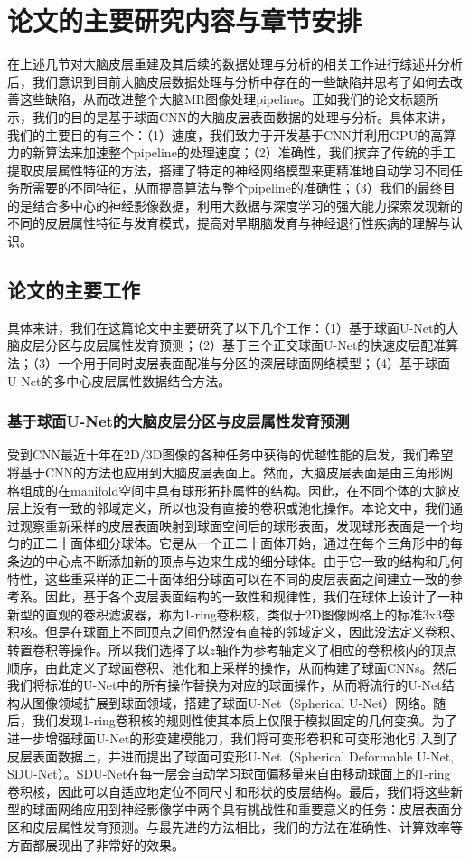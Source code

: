 \section{论文的主要研究内容与章节安排}
在上述几节对大脑皮层重建及其后续的数据处理与分析的相关工作进行综述并分析后，我们意识到目前大脑皮层数据处理与分析中存在的一些缺陷并思考了如何去改善这些缺陷，从而改进整个大脑MR图像处理pipeline。正如我们的论文标题所示，我们的目的是基于球面CNN的大脑皮层表面数据的处理与分析。具体来讲，我们的主要目的有三个：（1）速度，我们致力于开发基于CNN并利用GPU的高算力的新算法来加速整个pipeline的处理速度；（2）准确性，我们摈弃了传统的手工提取皮层属性特征的方法，搭建了特定的神经网络模型来更精准地自动学习不同任务所需要的不同特征，从而提高算法与整个pipeline的准确性；（3）我们的最终目的是结合多中心的神经影像数据，利用大数据与深度学习的强大能力探索发现新的不同的皮层属性特征与发育模式，提高对早期脑发育与神经退行性疾病的理解与认识。

\subsection{论文的主要工作}
具体来讲，我们在这篇论文中主要研究了以下几个工作：（1）基于球面U-Net的大脑皮层分区与皮层属性发育预测；（2）基于三个正交球面U-Net的快速皮层配准算法；（3）一个用于同时皮层表面配准与分区的深层球面网络模型；（4）基于球面U-Net的多中心皮层属性数据结合方法。

\subsubsection{基于球面U-Net的大脑皮层分区与皮层属性发育预测}
受到CNN最近十年在2D/3D图像的各种任务中获得的优越性能的启发，我们希望将基于CNN的方法也应用到大脑皮层表面上。然而，大脑皮层表面是由三角形网格组成的在manifold空间中具有球形拓扑属性的结构。因此，在不同个体的大脑皮层上没有一致的邻域定义，所以也没有直接的卷积或池化操作。本论文中，我们通过观察重新采样的皮层表面映射到球面空间后的球形表面，发现球形表面是一个均匀的正二十面体细分球体。它是从一个正二十面体开始，通过在每个三角形中的每条边的中心点不断添加新的顶点与边来生成的细分球体。由于它一致的结构和几何特性，这些重采样的正二十面体细分球面可以在不同的皮层表面之间建立一致的参考系。因此，基于各个皮层表面结构的一致性和规律性，我们在球体上设计了一种新型的直观的卷积滤波器，称为1-ring卷积核，类似于2D图像网格上的标准3x3卷积核。但是在球面上不同顶点之间仍然没有直接的邻域定义，因此没法定义卷积、转置卷积等操作。所以我们选择了以$z$轴作为参考轴定义了相应的卷积核内的顶点顺序，由此定义了球面卷积、池化和上采样的操作，从而构建了球面CNNs。然后我们将标准的U-Net\cite{ronneberger2015u}中的所有操作替换为对应的球面操作，从而将流行的U-Net结构从图像领域扩展到球面领域，搭建了球面U-Net（Spherical U-Net）网络。随后，我们发现1-ring卷积核的规则性使其本质上仅限于模拟固定的几何变换。为了进一步增强球面U-Net的形变建模能力，我们将可变形卷积和可变形池化引入到了皮层表面数据上，并进而提出了球面可变形U-Net（Spherical Deformable U-Net, SDU-Net）。SDU-Net在每一层会自动学习球面偏移量来自由移动球面上的1-ring卷积核，因此可以自适应地定位不同尺寸和形状的皮层结构。最后，我们将这些新型的球面网络应用到神经影像学中两个具有挑战性和重要意义的任务：皮层表面分区和皮层属性发育预测。与最先进的方法相比，我们的方法在准确性、计算效率等方面都展现出了非常好的效果。

